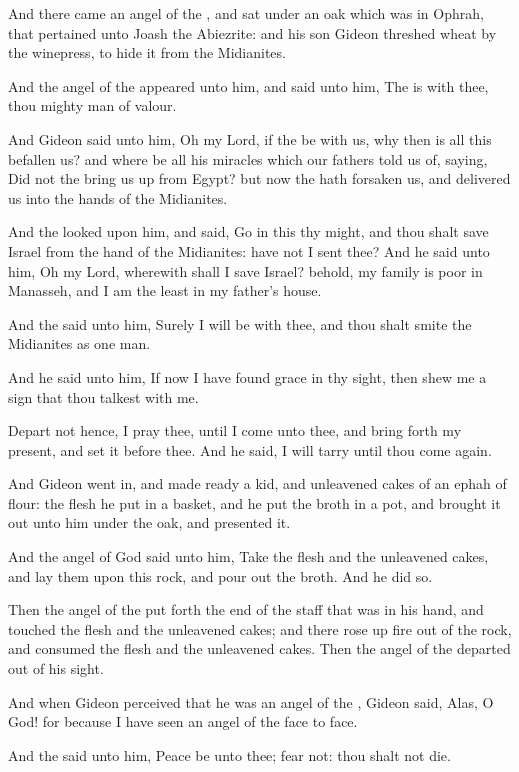 \Verse And there came an angel of the \LORD, and sat under an oak which was in Ophrah, that pertained unto Joash the Abiezrite: and his son Gideon threshed wheat by the winepress, to hide it from the Midianites.

\Verse And the angel of the \LORD appeared unto him, and said unto him, The \LORD is with thee, thou mighty man of valour.

\Verse And Gideon said unto him, Oh my Lord, if the \LORD be with us, why then is all this befallen us? and where be all his miracles which our fathers told us of, saying, Did not the \LORD bring us up from Egypt?  but now the \LORD hath forsaken us, and delivered us into the hands of the Midianites.

\Verse And the \LORD looked upon him, and said, Go in this thy might, and thou shalt save Israel from the hand of the Midianites: have not I sent thee?  \Verse And he said unto him, Oh my Lord, wherewith shall I save Israel?  behold, my family is poor in Manasseh, and I am the least in my father's house.

\Verse And the \LORD said unto him, Surely I will be with thee, and thou shalt smite the Midianites as one man.

\Verse And he said unto him, If now I have found grace in thy sight, then shew me a sign that thou talkest with me.

\Verse Depart not hence, I pray thee, until I come unto thee, and bring forth my present, and set it before thee. And he said, I will tarry until thou come again.

\Verse And Gideon went in, and made ready a kid, and unleavened cakes of an ephah of flour: the flesh he put in a basket, and he put the broth in a pot, and brought it out unto him under the oak, and presented it.

\Verse And the angel of God said unto him, Take the flesh and the unleavened cakes, and lay them upon this rock, and pour out the broth.  And he did so.

\Verse Then the angel of the \LORD put forth the end of the staff that was in his hand, and touched the flesh and the unleavened cakes; and there rose up fire out of the rock, and consumed the flesh and the unleavened cakes. Then the angel of the \LORD departed out of his sight.

\Verse And when Gideon perceived that he was an angel of the \LORD, Gideon said, Alas, O \LORD God! for because I have seen an angel of the \LORD face to face.

\Verse And the \LORD said unto him, Peace be unto thee; fear not: thou shalt not die.


